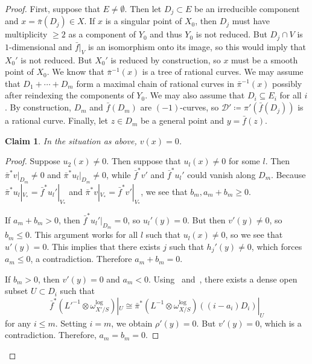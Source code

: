 \documentclass{amsart}
\newtheorem{claim}[thm]{Claim}
\theoremstyle{definition}
\theoremstyle{remark}
\theoremstyle{plain}
\theoremstyle{definition}
\theoremstyle{remark}
\newcommand{\mc}[1]{\mathcal{#1}}
\newcommand{\1}{\mathbf{1}}
\newcommand{\2}{\mathbf{2}}
\newcommand{\3}{\mathbf{3}}
\begin{document}
\begin{proof}
    First, suppose that $E \neq \emptyset$. Then let $D_j \subset E$ be an irreducible component and $x = \bar{\pi}(D_j) \in X$. If $x$ is a singular point of $X_0$, then $D_j$ must have multiplicity $\geq 2$ as a component of $Y_0$ and thus $Y_0$ is not reduced. But $D_j \cap V$ is $1$-dimensional and $\bar{f}|_V$ is an isomorphism onto its image, so this would imply that $X_0'$ is not reduced. But $X_0'$ is reduced by construction, so $x$ must be a smooth point of $X_0$. We know that $\bar{\pi}^{-1}(x)$ is a tree of rational curves. We may assume that $D_1 + \cdots + D_m$ form a maximal chain of rational curves in $\bar{\pi}^{-1}(x)$ possibly after reindexing the components of $Y_0$. We may also assume that $D_i \subseteq E_i$ for all $i$. By construction, $D_m$ and $\bar{f}(D_m)$ are $(-1)$-curves, so $\mc{D}' \coloneqq \pi' (\bar{f}(D_j))$ is a rational curve. Finally, let $z \in D_m$ be a general point and $y = \bar{f}(z)$.

    \begin{claim}\label{claim:viszero}
        In the situation as above, $v(x) = 0$.
    \end{claim}

    \begin{proof}
        Suppose $u_2(x) \neq 0$. Then suppose that $u_{l}(x) \neq 0$ for some $l$. Then $\bar{\pi}^* v |_{D_m} \neq 0$ and $\bar{\pi}^* u_{l}|_{D_m} \neq 0$, while $\bar{f}^* v'$ and $\bar{f}^* u_{l}'$ could vanish along $D_m$. Because $\bar{\pi}^* u_{l} |_{V_*} = \bar{f}^* u_{l}'|_{V_*}$ and $\bar{\pi}^* v |_{V_*} = \bar{f}^* v'|_{V_*}$, we see that $b_m, a_m + b_m \geq 0$.

        If $a_m + b_m > 0$, then $\bar{f}^*u_{l}'|_{D_m} = 0$, so $u_{l}'(y) = 0$. But then $v'(y) \neq 0$, so $b_m \leq 0$. This argument works for all $l$ such that $u_{l}(x) \neq 0$, so we see that $u'(y) = 0$. This implies that there exists $j$ such that $h_j'(y) \neq 0$, which forces $a_m \leq 0$, a contradiction. Therefore $a_m + b_m = 0$.

        If $b_m > 0$, then $v'(y) = 0$ and $a_m < 0$. Using~ and~, there exists a dense open subset $U \subset D_i$ such that
        \begin{equation}\label{eqn:logcansingledivisor}
            \bar{f}^*(L'^{-1} \otimes \omega_{X'/S}^{\log})|_U \cong \bar{\pi}^*(L^{-1} \otimes \omega^{\log}_{X/S})((i-a_i)D_i) |_{U}
        \end{equation}
        for any $i \leq m$. Setting $i=m$, we obtain $\rho'(y) = 0$. But $v'(y) = 0$, which is a contradiction. Therefore, $a_m = b_m = 0$.


\end{proof}
\end{proof}
\end{document}

